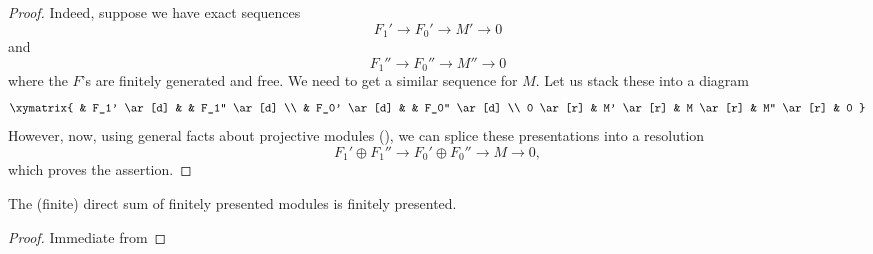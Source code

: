 \begin{proof} 
Indeed, suppose we have  exact sequences
\[ F_1' \to F_0' \to M' \to 0   \]
and
\[ F_1'' \to F_0'' \to M'' \to 0  \]
where the $F$'s are finitely generated and free. 
We need to get a similar sequence for $M$. 
Let us stack these into a diagram
\[ \xymatrix{
& F_1' \ar[d] & & F_1'' \ar[d]  \\
& F_0' \ar[d]  & & F_0'' \ar[d] \\
0 \ar[r] &  M' \ar[r] &  M \ar[r] &  M'' \ar[r] &  0
}\]
However, now, using general facts about projective modules (\rref{}), we can
splice these presentations into a resolution
\[ F_1' \oplus F_1'' \to F_0' \oplus F_0'' \to M \to 0,  \]
which proves the assertion.
\end{proof} 


\begin{corollary} 
The (finite) direct sum of finitely presented modules is finitely presented.
\end{corollary} 
\begin{proof} 
Immediate from 
\end{proof} 

